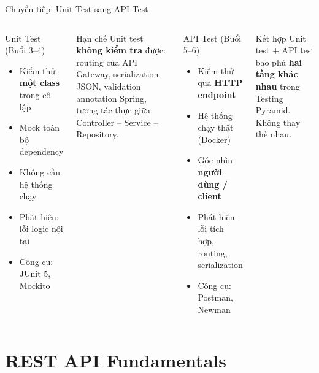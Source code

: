 \documentclass[aspectratio=169,10pt]{beamer}
\begin{document}
\begin{frame}{Chuyển tiếp: Unit Test sang API Test}
  \begin{columns}
    \begin{block}{Unit Test (Buổi 3--4)}
      \begin{itemize}
        \item Kiểm thử \textbf{một class} trong cô lập
        \item Mock toàn bộ dependency
        \item Không cần hệ thống chạy
        \item Phát hiện: lỗi logic nội tại
        \item Công cụ: JUnit 5, Mockito
      \end{itemize}
    \end{block}

    \begin{alertblock}{Hạn chế}
      Unit test \textbf{không kiểm tra} được:
      routing của API Gateway, serialization JSON,
      validation annotation Spring, tương tác thực
      giữa Controller -- Service -- Repository.
    \end{alertblock}

    \begin{block}{API Test (Buổi 5--6)}
      \begin{itemize}
        \item Kiểm thử qua \textbf{HTTP endpoint}
        \item Hệ thống chạy thật (Docker)
        \item Góc nhìn \textbf{người dùng / client}
        \item Phát hiện: lỗi tích hợp, routing, serialization
        \item Công cụ: Postman, Newman
      \end{itemize}
    \end{block}

    \begin{exampleblock}{Kết hợp}
      Unit test $+$ API test bao phủ \textbf{hai tầng khác nhau}
      trong Testing Pyramid. Không thay thế nhau.
    \end{exampleblock}
  \end{columns}
\end{frame}

\section{REST API Fundamentals}
\end{document}
